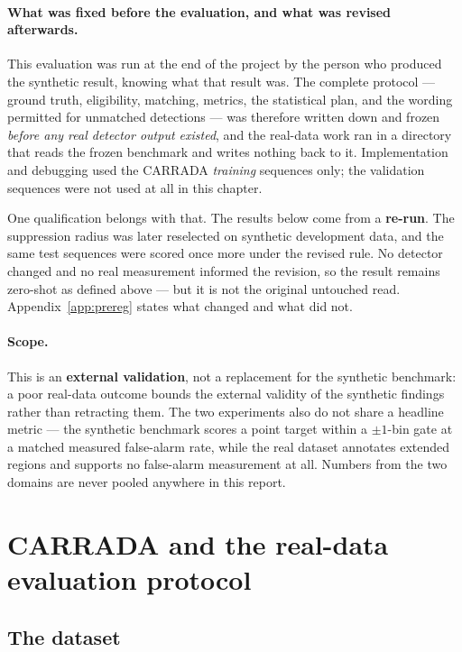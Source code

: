 \paragraph{What was fixed before the evaluation, and what was revised afterwards.}
This evaluation was run at the end of the project by the person who produced the synthetic result,
knowing what that result was. The complete protocol --- ground truth, eligibility, matching,
metrics, the statistical plan, and the wording permitted for unmatched detections --- was therefore
written down and frozen \emph{before any real detector output existed}, and the real-data work ran
in a directory that reads the frozen benchmark and writes nothing back to it. Implementation and
debugging used the CARRADA \emph{training} sequences only; the validation sequences were not used at
all in this chapter.

One qualification belongs with that. The results below come from a \textbf{re-run}. The suppression
radius was later reselected on synthetic development data, and the same test sequences were scored
once more under the revised rule. No detector changed and no real measurement informed the revision,
so the result remains zero-shot as defined above --- but it is not the original untouched read.
Appendix~\ref{app:prereg} states what changed and what did not.

\paragraph{Scope.} This is an \textbf{external validation}, not a replacement for the synthetic
benchmark: a poor real-data outcome bounds the external validity of the synthetic findings rather
than retracting them. The two experiments also do not share a headline metric --- the synthetic
benchmark scores a point target within a $\pm 1$-bin gate at a matched measured false-alarm rate,
while the real dataset annotates extended regions and supports no false-alarm measurement at all.
Numbers from the two domains are never pooled anywhere in this report.

\section{CARRADA and the real-data evaluation protocol}
\label{sec:r7protocol}

\subsection{The dataset}
\label{sec:carrada}

